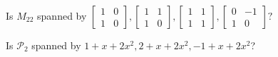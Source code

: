 \documentclass[11pt,letterpaper,boxed]{hmcpset}
\begin{document}
\begin{solution}
\vfill
\end{solution}
\newpage

\begin{problem}[Poole 6.1 \#60]
Is $M_{22}$ spanned by $\begin{bmatrix}1 & 0\\1&0\end{bmatrix}, \begin{bmatrix}1 & 1\\1&0\end{bmatrix}, \begin{bmatrix}1 & 1\\1&1\end{bmatrix},
 \begin{bmatrix}0 & -1\\1&0\end{bmatrix}?$
\end{problem}

\begin{solution}
\vfill
\end{solution}
\newpage

\begin{problem}[Poole 6.1 \#62]
Is $\mathscr{P}_2$ spanned by $1+x+2x^2, 2+x+2x^2, -1+x+2x^2$?
\end{problem}

\begin{solution}
\vfill
\end{solution}
\newpage
\end{document}
